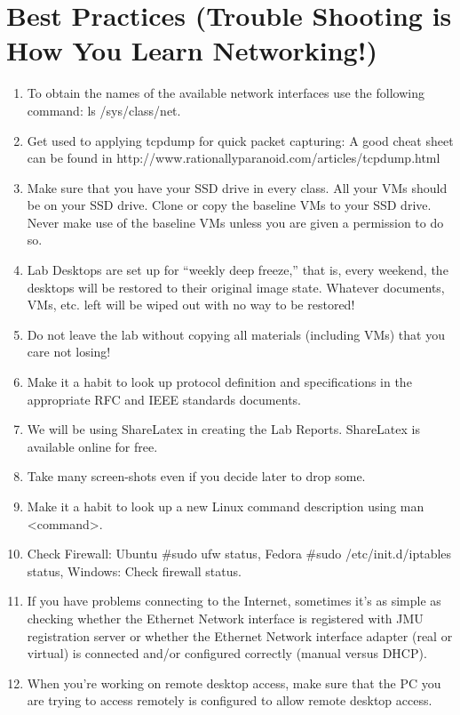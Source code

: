 \documentclass[main.tex]{subfiles}
\begin{document}
\section{Best Practices (Trouble Shooting is How You Learn Networking!)}\label{sec3}
\begin{enumerate}[noitemsep,label=$\bullet$,leftmargin=16mm,labelsep=0.5cm]
\item{To obtain the names of the available network interfaces use the following command: ls /sys/class/net.}
\item{Get used to applying tcpdump for quick packet capturing:  A good cheat sheet  can be found in http://www.rationallyparanoid.com/articles/tcpdump.html}
\item{Make sure that you have your SSD drive in every class.  All your VMs should be on your SSD drive. Clone or copy the baseline VMs to your SSD drive.  Never make use of the baseline VMs unless you are given a permission to do so.}
\item{Lab Desktops are set up for “weekly deep freeze,” that is, every weekend, the desktops will be restored to their original image state. Whatever documents, VMs, etc. left will be wiped out with no way to be restored!}
\item{Do not leave the lab without copying all materials (including VMs) that you care not losing!}
\item{Make it a habit to look up protocol definition and specifications in the appropriate RFC and IEEE standards documents.}
\item{We will be using ShareLatex in creating the Lab Reports.  ShareLatex is available online for free.}
\item{Take many screen-shots even if you decide later to drop some.}
\item{Make it a habit to look up a new Linux command description using man <command>.}
\item{Check Firewall: Ubuntu \#sudo ufw status, Fedora \#sudo /etc/init.d/iptables status, Windows: Check firewall status.}
\item{If you have problems connecting to the Internet, sometimes it's as simple as checking whether the Ethernet Network interface is registered with JMU registration server or whether the Ethernet Network interface adapter (real or virtual) is connected and/or configured correctly (manual versus DHCP).}
\item{When you're working on remote desktop access, make sure that the PC you are trying to access remotely is configured to allow remote desktop access.}

\end{enumerate}
\end{document}
